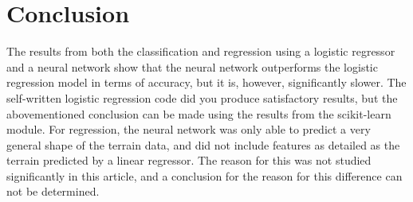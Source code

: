\documentclass[a4paper,10pt,english]{article}
\begin{document}
\section{Conclusion}

The results from both the classification and regression using a logistic regressor and a neural network show that the neural network outperforms the logistic regression model in terms of accuracy, but it is, however, significantly slower. The self-written logistic regression code did you produce satisfactory results, but the abovementioned conclusion can be made using the results from the scikit-learn module. For regression, the neural network was only able to predict a very general shape of the terrain data, and did not include features as detailed as the terrain predicted by a linear regressor. The reason for this was not studied significantly in this article, and a conclusion for the reason for this difference can not be determined.
\end{document}

